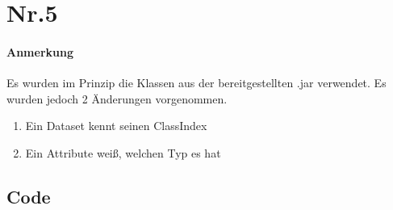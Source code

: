 \documentclass[a4paper,11pt,twoside]{article}
\begin{document}
\section*{Nr.5}
\paragraph{Anmerkung}
Es wurden im Prinzip die Klassen aus der bereitgestellten .jar verwendet. Es wurden jedoch 2 Änderungen vorgenommen.
\begin{enumerate}
	\item Ein Dataset kennt seinen ClassIndex
	\item Ein Attribute weiß, welchen Typ es hat
\end{enumerate}
\pagebreak
\subsection*{Code}

\end{document}
